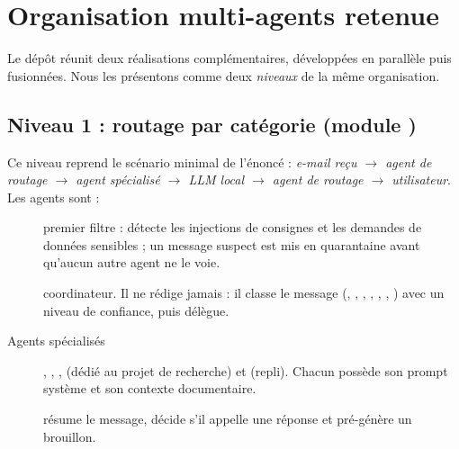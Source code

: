 \section{Organisation multi-agents retenue}
\label{sec:orga}

Le dépôt réunit deux réalisations complémentaires, développées en parallèle puis fusionnées. Nous les présentons comme deux \emph{niveaux} de la même organisation.

\subsection{Niveau 1 : routage par catégorie (module )}

Ce niveau reprend le scénario minimal de l'énoncé : \emph{e-mail reçu $\rightarrow$ agent de routage $\rightarrow$ agent spécialisé $\rightarrow$ LLM local $\rightarrow$ agent de routage $\rightarrow$ utilisateur}. Les agents sont :

\begin{description}
  \item[] premier filtre : détecte les injections de consignes et les demandes de données sensibles ; un message suspect est mis en quarantaine avant qu'aucun autre agent ne le voie.
  \item[] coordinateur. Il ne rédige jamais : il classe le message (, , , , , , ) avec un niveau de confiance, puis délègue.
  \item[Agents spécialisés] , , ,  (dédié au projet de recherche) et  (repli). Chacun possède son prompt système et son contexte documentaire.
  \item[] résume le message, décide s'il appelle une réponse et pré-génère un brouillon.
\end{description}

